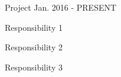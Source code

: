 

\begin{cventries}

  \cventry
    {Project} %
    {}
    {} %
    {Jan. 2016 - PRESENT} %
    {
      \begin{cvitems} %
        \item {Responsibility 1}
        \item {Responsibility 2}
        \item {Responsibility 3}
      \end{cvitems}
    }
\end{cventries}

